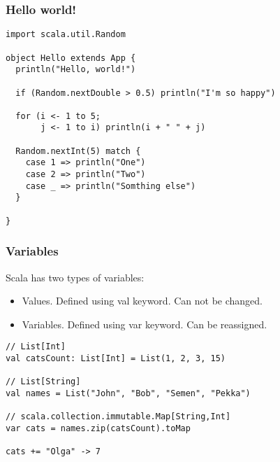 \begin{frame}[fragile]
\frametitle{Hello world!}

\begin{lstlisting}
import scala.util.Random

object Hello extends App {
  println("Hello, world!")

  if (Random.nextDouble > 0.5) println("I'm so happy")

  for (i <- 1 to 5;
       j <- 1 to i) println(i + " " + j)

  Random.nextInt(5) match {
    case 1 => println("One")
    case 2 => println("Two")
    case _ => println("Somthing else")
  }

}
\end{lstlisting}

\end{frame}

\begin{frame}[fragile]
\frametitle{Variables}
Scala has two types of variables:
\begin{itemize}
  \item Values. Defined using val keyword. Can not be changed.
  \item Variables. Defined using var keyword. Can be reassigned.
\end{itemize}

\begin{example}
\begin{lstlisting}
// List[Int]
val catsCount: List[Int] = List(1, 2, 3, 15)

// List[String] 
val names = List("John", "Bob", "Semen", "Pekka")

// scala.collection.immutable.Map[String,Int]
var cats = names.zip(catsCount).toMap

cats += "Olga" -> 7
\end{lstlisting}
\end{example}

\end{frame}


